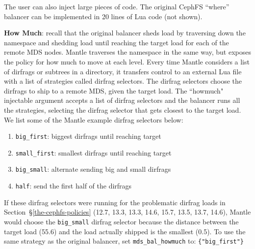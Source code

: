 The user can also inject large pieces of code. The original CephFS ``where'' balancer can be implemented in 20 lines of Lua code (not shown). 

\textbf{How Much}: recall that the original balancer sheds load by traversing down the namespace and shedding load until reaching the target load for each of the remote MDS nodes. Mantle traverses the namespace in the same way, but exposes the policy for how much to move at each level. Every time Mantle considers a list of dirfrags or subtrees in a directory, it transfers control to an external Lua file with a list of strategies called dirfrag selectors. The dirfrag selectors choose the dirfrags to ship to a remote MDS, given the target load. The ``howmuch" injectable argument accepts a list of dirfrag selectors and the balancer runs all the strategies, selecting the dirfrag selector that gets closest to the target load. We list some of the Mantle example dirfrag selectors below:
\begin{enumerate}\itemsep -2pt
	\item \texttt{big\_first}: biggest dirfrags until reaching target
	\item \texttt{small\_first}: smallest dirfrags until reaching target
	\item \texttt{big\_small}: alternate sending big and small dirfrags
	\item \texttt{half}: send the first half of the dirfrags
\end{enumerate}
If these dirfrag selectors were running for the problematic dirfrag loads in Section~\S\ref{the-cephfs-policies} (12.7, 13.3, 13.3, 14.6, 15.7, 13.5, 13.7, 14.6),  Mantle would choose the \texttt{big\_small} dirfrag selector because the distance between the target load (55.6) and the load actually shipped is the smallest (0.5). To use the same strategy as the original balancer, set \texttt{mds\_bal\_how\-much} to: \texttt{\{"big\_first"\}}

